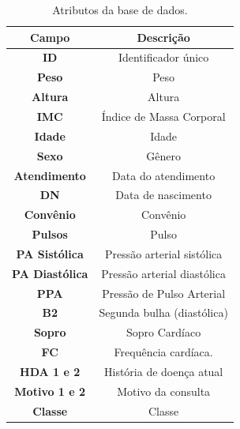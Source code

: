 \begin{table}[!t]
    \renewcommand{\arraystretch}{1.3}
    \caption{Atributos da base de dados.}
    \label{table:features}
    \centering
    \begin{tabular}{|c||c|}
        \hline
        \textbf{Campo}         & \textbf{Descrição}          \\ \hline
        \textbf{ID}            & Identificador único         \\ \hline
        \textbf{Peso}          & Peso                        \\ \hline
        \textbf{Altura}        & Altura                      \\ \hline
        \textbf{IMC}           & Índice de Massa Corporal    \\ \hline
        \textbf{Idade}         & Idade                       \\ \hline
        \textbf{Sexo}          & Gênero                      \\ \hline
        \textbf{Atendimento}   & Data do atendimento         \\ \hline
        \textbf{DN}            & Data de nascimento          \\ \hline
        \textbf{Convênio}      & Convênio                    \\ \hline
        \textbf{Pulsos}        & Pulso                       \\ \hline
        \textbf{PA Sistólica}  & Pressão arterial sistólica  \\ \hline
        \textbf{PA Diastólica} & Pressão arterial diastólica \\ \hline
        \textbf{PPA}           & Pressão de Pulso Arterial   \\ \hline
        \textbf{B2}            & Segunda bulha (diastólica)  \\ \hline
        \textbf{Sopro}         & Sopro Cardíaco              \\ \hline
        \textbf{FC}            & Frequência cardíaca.        \\ \hline
        \textbf{HDA 1 e 2}     & História de doença atual    \\ \hline
        \textbf{Motivo 1 e 2}  & Motivo da consulta          \\ \hline
        \textbf{Classe}        & Classe                      \\ \hline
    \end{tabular}
\end{table}

